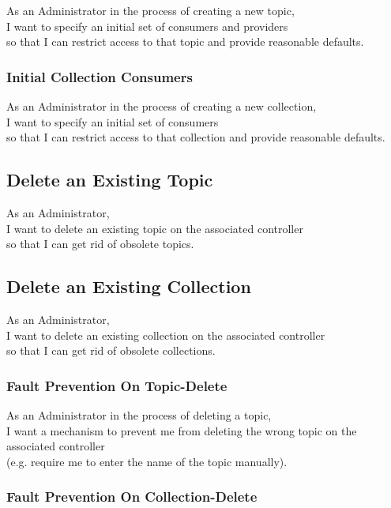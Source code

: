 As an Administrator in the process of creating a new topic,\\
I want to specify an initial set of consumers and providers \\
so that I can restrict access to that topic and provide reasonable defaults.

\subsubsection{Initial Collection Consumers}\label{sec:requirement-initial-collection-consumer}

As an Administrator in the process of creating a new collection,\\
I want to specify an initial set of consumers \\
so that I can restrict access to that collection and provide reasonable defaults.

\subsection{Delete an Existing Topic}\label{sec:delete-topic}

As an Administrator,\\
I want to delete an existing topic on the associated controller\\
so that I can get rid of obsolete topics.

\subsection{Delete an Existing Collection}\label{sec:delete-collection}

As an Administrator,\\
I want to delete an existing collection on the associated controller\\
so that I can get rid of obsolete collections.


\subsubsection{Fault Prevention On Topic-Delete}

As an Administrator in the process of deleting a topic, \\
I want a mechanism to prevent me from deleting the wrong topic on the associated controller\\
(e.g. require me to enter the name of the topic manually).

\subsubsection{Fault Prevention On Collection-Delete}

